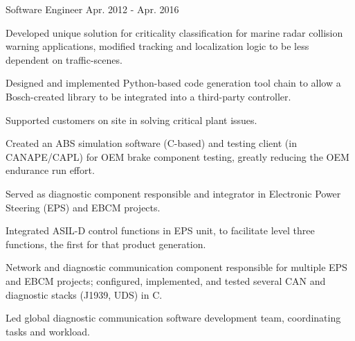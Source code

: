 \begin{cventries}
  \cventry
    {Software Engineer} %
    {} %
    {} %
    {Apr. 2012 - Apr. 2016} %
    {
      \begin{cvitems} %
        \item {Developed unique solution for criticality classification for marine radar collision warning applications, modified tracking and localization logic to be less dependent on traffic-scenes.}
        \item {Designed and implemented Python-based code generation tool chain to allow a Bosch-created library to be integrated into a third-party controller.}
        \item {Supported customers on site in solving critical plant issues.}
        \item {Created an ABS simulation software (C-based) and testing client (in CANAPE/CAPL) for OEM brake component testing, greatly reducing the OEM endurance run effort.}
        \item {Served as diagnostic component responsible and integrator in Electronic Power Steering (EPS) and EBCM projects.}
        \item {Integrated ASIL-D control functions in EPS unit, to facilitate level three functions, the first for that product generation.}
        \item {Network and diagnostic communication component responsible for multiple EPS and EBCM projects; configured, implemented, and tested several CAN and diagnostic stacks (J1939, UDS) in C.}
        \item {Led global diagnostic communication software development team, coordinating tasks and workload.}
      \end{cvitems}
    }
\end{cventries}
